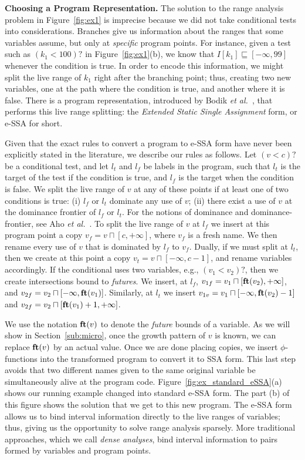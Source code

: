 \documentclass[times]{speauth}
\newcommand{\fun}[1]{\mbox{\textbf{#1}}}
\begin{document}
\noindent
\textbf{Choosing a Program Representation.}
The solution to the range analysis problem in Figure~\ref{fig:ex1}
is imprecise because we did not take conditional tests into considerations.
Branches give us information about the ranges that some variables assume, but
only at {\em specific} program points.
For instance, given a test such as $(k_1 < 100)?$ in  Figure~\ref{fig:ex1}(b),
we know that $I[k_1] \sqsubseteq [-\infty, 99]$ whenever the condition is true.
In order to encode this information, we might split the live range of $k_1$
right after the branching point; thus, creating two new variables, one at the
path where the condition is true, and another where it is false.
There is a program representation, introduced by Bodik
{\em et al.}~\cite{Bodik00}, that performs this live range splitting:
the {\em Extended Static Single Assignment} form, or e-SSA for short.

Given that the exact rules to convert a program to e-SSA form have never been
explicitly stated in the literature, we describe our rules as follows.
Let $(v < c)?$ be a conditional test, and let $l_t$ and $l_f$ be labels in
the program, such that $l_t$ is the target of the test if the condition is true,
and $l_f$ is the target when the condition is false.
We split the live range of $v$ at any of these points if at least one of two
conditions is true:
(i) $l_f$ or $l_t$ dominate any use of $v$;
(ii) there exist a use of $v$ at the dominance frontier of $l_f$ or $l_t$.
For the notions of dominance and dominance-frontier, see Aho
{\em et al.}~\cite[p.656]{Aho06}.
To split the live range of $v$ at $l_f$ we insert at this
program point a copy $v_f = v \sqcap [c, +\infty]$, where $v_f$ is a fresh name.
We then rename every use of $v$ that is dominated by $l_f$ to $v_f$.
Dually, if we must split at $l_t$, then we create at this point a copy
$v_t = v \sqcap [-\infty, c-1]$, and rename variables accordingly.
If the conditional uses two variables, e.g., $(v_1 < v_2)?$, then we create
intersections bound to {\em futures}.
We insert, at $l_f$, $v_{1f} = v_1 \sqcap [\fun{ft}(v_2), +\infty]$,
and $v_{2f} = v_2 \sqcap [-\infty, \fun{ft}(v_1)]$.
Similarly, at $l_t$ we insert
$v_{1v} = v_1 \sqcap [-\infty, \fun{ft}(v_2) - 1]$
and $v_{2f} = v_2 \sqcap [\fun{ft}(v_1) + 1, +\infty]$.

We use the notation $\fun{ft}(v)$ to denote the {\em future} bounds of a
variable.
As we will show in Section~\ref{sub:micro}, once the growth pattern of $v$ is
known, we can replace $\fun{ft}(v)$ by an actual value.
Once we are done placing copies, we insert $\phi$-functions into the
transformed program to convert it to SSA form.
This last step avoids that two different names given to the same original
variable be simultaneously alive at the program code.
Figure~\ref{fig:ex_standard_eSSA}(a) shows our running example changed into
standard e-SSA form.
The part (b) of this figure shows the solution that we get to this new
program.
The e-SSA form allows us to bind interval information directly to the live
ranges of variables; thus, giving us the opportunity to solve range analysis
sparsely.
More traditional approaches, which we call {\em dense analyses}, bind
interval information to pairs formed by variables and program points.
\end{document}
